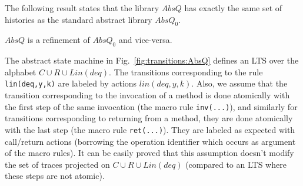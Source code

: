 

The following result states that the library $AbsQ$ has exactly the same set of histories as the standard abstract library $AbsQ_0$. %

\vspace{-1.5mm}
\begin{theorem}\label{th:absImplQueue}
$AbsQ$ is a refinement of $AbsQ_0$ and vice-versa.
\vspace{-2mm}
\end{theorem}

The abstract state machine in Fig.~\ref{fig:transitions:AbsQ} defines an LTS over the alphabet $C\cup R\cup Lin(deq)$. The transitions corresponding to the rule {\tt lin(deq,y,k)} are labeled by  actions $lin(deq,y,k)$. Also, we assume that the transition corresponding to the invocation of a method is done atomically with the first step of the same invocation (the macro rule {\tt inv(...)}), and similarly for transitions corresponding to returning from a method, they are done atomically with the last step (the macro rule {\tt ret(...)}). They are labeled as expected with call/return actions (borrowing the operation identifier which occurs as argument of the macro rules). It can be easily proved that this assumption doesn't modify the set of traces projected on $C\cup R\cup Lin(deq)$ (compared to an LTS where these steps are not atomic).



